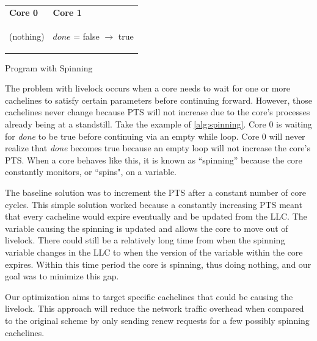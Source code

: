 \documentclass[12pt]{article}
\begin{document}
\begin{center} 
	
	\begin{tabular}{p{5cm} p{5cm}}
		\textbf{Core 0} & \textbf{Core 1} \\
		\begin{algorithm}[H]
			\While{!done}
			{(nothing)}
			
		\end{algorithm}
		&
		\begin{algorithm}[H]
			$done$ = false $\rightarrow$  true
		\end{algorithm}
		\\
	\end{tabular}
	\begin{algorithm}
		\caption{Program with Spinning}\label{alg:spinning}
	\end{algorithm}
\end{center}
The problem with livelock occurs when a core needs to wait for one or 
more cachelines to satisfy certain parameters before continuing 
forward. However, those cachelines never change because PTS will not  
increase due to the core's processes already being at a standstill. Take  the example of \cref{alg:spinning}. Core 0 is waiting for \textit{done} to  
be true before continuing via an empty while loop. Core 0 will never 
realize that \textit{done} becomes true because an empty loop will not increase 
the core's PTS. When a core behaves like this, it is known as 
``spinning'' because the core constantly monitors, or ``spins", on a 
variable. 

The baseline solution was to increment the PTS after a constant number 
of core cycles. This simple solution worked because a constantly 
increasing PTS meant that every cacheline would expire eventually and 
be updated from the LLC. The variable causing the spinning is updated 
and allows the core to move out of livelock. There could still be 
a relatively long time from when the spinning variable changes in the 
LLC to when the version of the variable within the core expires.  
Within this time period the core is spinning, thus doing nothing, and 
our goal was to minimize this gap. 
	
	
Our optimization aims to target specific cachelines that could be 
causing the livelock. This approach will reduce the network traffic 
overhead when compared to the original scheme by only sending renew 
requests for a few possibly spinning cachelines.
	
\end{document}
